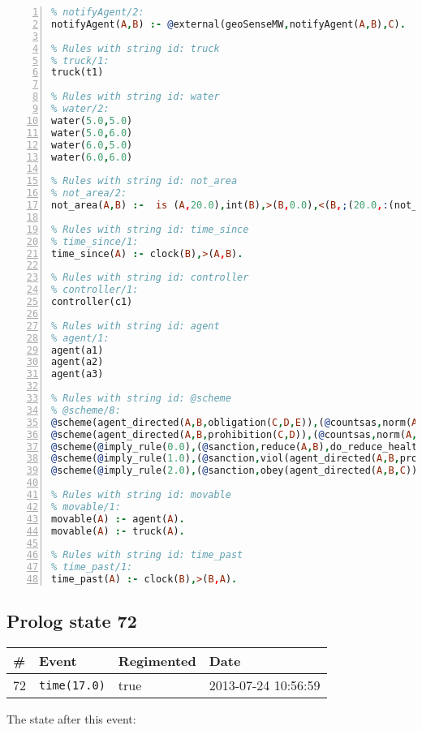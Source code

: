 \documentclass[11pt]{article}\usepackage[utf8]{inputenc}\usepackage{geometry}
\begin{document}
\begin{lstlisting}[language=Prolog, numbers=left]
% Rules with string id: notifyAgent
% notifyAgent/2:
notifyAgent(A,B) :- @external(geoSenseMW,notifyAgent(A,B),C).

% Rules with string id: truck
% truck/1:
truck(t1)

% Rules with string id: water
% water/2:
water(5.0,5.0)
water(5.0,6.0)
water(6.0,5.0)
water(6.0,6.0)

% Rules with string id: not_area
% not_area/2:
not_area(A,B) :-  is (A,20.0),int(B),>(B,0.0),<(B,;(20.0,:(not_area(A,B), is (-(B),20.0)))),int(A),>(A,0.0),<(A,;(20.0,:(area(A,B),-(int(A))))),int(B),>(A,0.0),>(B,0.0),<(A,21.0),<(B,21.0).

% Rules with string id: time_since
% time_since/1:
time_since(A) :- clock(B),>(A,B).

% Rules with string id: controller
% controller/1:
controller(c1)

% Rules with string id: agent
% agent/1:
agent(a1)
agent(a2)
agent(a3)

% Rules with string id: @scheme
% @scheme/8:
@scheme(agent_directed(A,B,obligation(C,D,E)),(@countsas,norm(A,B,F,obligation(C,D,E)),F),false,(listTrue(C)),(time_past(D)),false,[plus(viol(agent_directed(A,B,obligation(C,D,E))))|[]],[plus(obey(agent_directed(A,B,obligation(C,D,E))))|[]])
@scheme(agent_directed(A,B,prohibition(C,D)),(@countsas,norm(A,B,E,prohibition(C,D)),E),(listTrue(C)),false,(false),false,[plus(viol(agent_directed(A,B,prohibition(C,D))))|[]],[plus(obey(agent_directed(A,B,prohibition(C,D))))|[]])
@scheme(@imply_rule(0.0),(@sanction,reduce(A,B),do_reduce_health(A,B),notifyAgent(A,changed(status))),true,false,false,false,[min(reduce(A,B))|[]],[])
@scheme(@imply_rule(1.0),(@sanction,viol(agent_directed(A,B,prohibition(C,D))),do_sanction(D)),true,false,false,false,[min(viol(agent_directed(A,B,prohibition(C,D))))|[]],[])
@scheme(@imply_rule(2.0),(@sanction,obey(agent_directed(A,B,C))),true,false,false,false,[min(obey(agent_directed(A,B,C)))|[]],[])

% Rules with string id: movable
% movable/1:
movable(A) :- agent(A).
movable(A) :- truck(A).

% Rules with string id: time_past
% time_past/1:
time_past(A) :- clock(B),>(B,A).

\end{lstlisting}
\clearpage 
\subsection{Prolog state 72}
\begin{table}[ht]
\centering 
\begin{tabular}{l l l l} 
\textbf{\#} & \textbf{Event} & \textbf{Regimented} & \textbf{Date} \\ [0.5ex] 
\hline
72&\texttt{time(17.0)}&true&2013-07-24 10:56:59\\ [1ex] \hline\end{tabular}
\end{table}
The state after this event:
\end{document}
